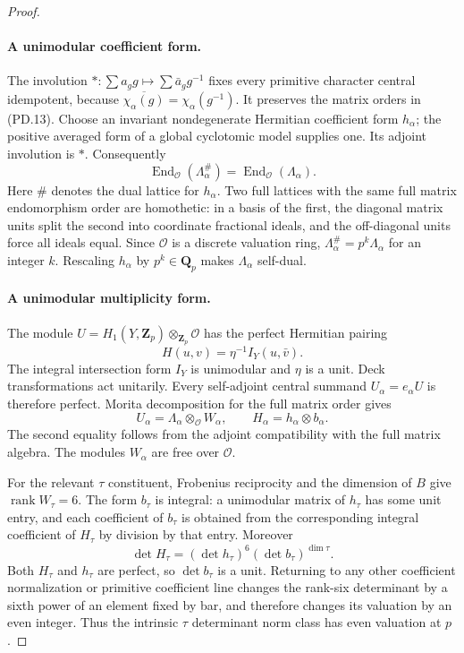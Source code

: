 \begin{proof}
\paragraph{A unimodular coefficient form.}
The involution
$*:\sum a_g g\mapsto\sum\bar a_g g^{-1}$
fixes every primitive character central idempotent, because
$\overline{\chi_\alpha(g)}=\chi_\alpha(g^{-1})$.
It preserves the matrix orders in (PD.13).
Choose an invariant nondegenerate Hermitian coefficient form
$h_\alpha$; the positive averaged form of a global cyclotomic
model supplies one.  Its adjoint involution is $*$.
Consequently
\[
 \operatorname{End}_{\mathcal O}(\Lambda_\alpha^\#)
       =\operatorname{End}_{\mathcal O}(\Lambda_\alpha).
 \tag{PD.14}
\]
Here $\#$ denotes the dual lattice for $h_\alpha$.
Two full lattices with the same full matrix endomorphism
order are homothetic: in a basis of the first, the diagonal
matrix units split the second into coordinate fractional
ideals, and the off-diagonal units force all ideals equal.
Since $\mathcal O$ is a discrete valuation ring,
$\Lambda_\alpha^\#=p^k\Lambda_\alpha$ for an integer $k$.
Rescaling $h_\alpha$ by $p^k\in\mathbf Q_p$ makes
$\Lambda_\alpha$ self-dual.

\paragraph{A unimodular multiplicity form.}
The module
$U=H_1(Y,\mathbf Z_p)\otimes_{\mathbf Z_p}\mathcal O$
has the perfect Hermitian pairing
\[
                    H(u,v)=\eta^{-1}I_Y(u,\bar v).
 \tag{PD.15}
\]
The integral intersection form $I_Y$ is unimodular and
$\eta$ is a unit.  Deck transformations act unitarily.
Every self-adjoint central summand $U_\alpha=e_\alpha U$
is therefore perfect.  Morita decomposition for the full
matrix order gives
\[
 U_\alpha=\Lambda_\alpha\otimes_{\mathcal O}W_\alpha,
          \qquad H_\alpha=h_\alpha\otimes b_\alpha.
 \tag{PD.16}
\]
The second equality follows from the adjoint compatibility
with the full matrix algebra.  The modules $W_\alpha$ are
free over $\mathcal O$.

For the relevant $\tau$ constituent, Frobenius reciprocity
and the dimension of $B$ give $\operatorname{rank}W_\tau=6$.
The form $b_\tau$ is integral: a unimodular matrix of
$h_\tau$ has some unit entry, and each coefficient of $b_\tau$
is obtained from the corresponding integral coefficient of
$H_\tau$ by division by that entry.  Moreover
\[
        \det H_\tau=(\det h_\tau)^6
                            (\det b_\tau)^{\dim\tau}.
 \tag{PD.17}
\]
Both $H_\tau$ and $h_\tau$ are perfect, so $\det b_\tau$
is a unit.  Returning to any other coefficient normalization
or primitive coefficient line changes the rank-six determinant
by a sixth power of an element fixed by bar, and therefore
changes its valuation by an even integer.
Thus the intrinsic $\tau$ determinant norm class has even
valuation at $p$.


\end{proof}
